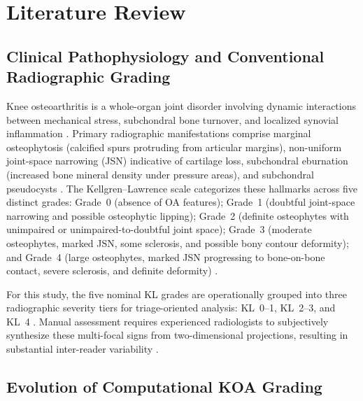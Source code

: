 \documentclass[10pt,journal]{IEEEtran}
\begin{document}
\section{Literature Review}
\label{sec:literature}

\subsection{Clinical Pathophysiology and Conventional Radiographic Grading}
\label{subsec:clinical_background}

Knee osteoarthritis is a whole-organ joint disorder involving dynamic interactions between mechanical stress, subchondral bone turnover, and localized synovial inflammation \cite{loeser2012oa, hunter2019oa}. Primary radiographic manifestations comprise marginal osteophytosis (calcified spurs protruding from articular margins), non-uniform joint-space narrowing (JSN) indicative of cartilage loss, subchondral eburnation (increased bone mineral density under pressure areas), and subchondral pseudocysts \cite{braun2012diagnosis}. The Kellgren--Lawrence scale categorizes these hallmarks across five distinct grades: Grade~0 (absence of OA features); Grade~1 (doubtful joint-space narrowing and possible osteophytic lipping); Grade~2 (definite osteophytes with unimpaired or unimpaired-to-doubtful joint space); Grade~3 (moderate osteophytes, marked JSN, some sclerosis, and possible bony contour deformity); and Grade~4 (large osteophytes, marked JSN progressing to bone-on-bone contact, severe sclerosis, and definite deformity) \cite{kellgren1957radiological}.

For this study, the five nominal KL grades are operationally grouped into three radiographic severity tiers for triage-oriented analysis: KL~0--1, KL~2--3, and KL~4 \cite{zhang2010eular, carr2012knee}. Manual assessment requires experienced radiologists to subjectively synthesize these multi-focal signs from two-dimensional projections, resulting in substantial inter-reader variability \cite{schiphof2008differences, wright2014interobserver}.

\subsection{Evolution of Computational KOA Grading}
\label{subsec:evolution}
\end{document}
